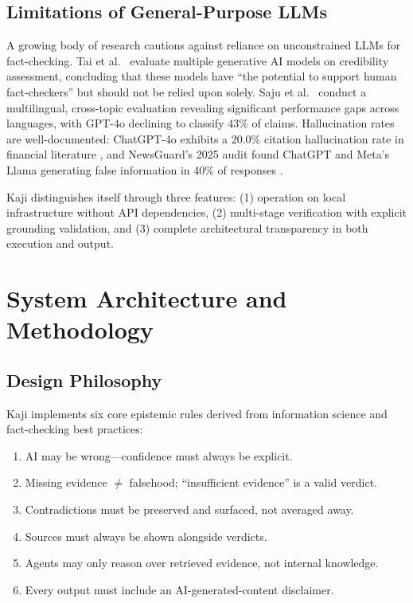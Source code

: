\documentclass[conference]{IEEEtran}
\begin{document}
\subsection{Limitations of General-Purpose LLMs}

A growing body of research cautions against reliance on unconstrained LLMs for fact-checking. Tai et al.\ \cite{tai2025} evaluate multiple generative AI models on credibility assessment, concluding that these models have ``the potential to support human fact-checkers'' but should not be relied upon solely. Saju et al.\ \cite{saju2025} conduct a multilingual, cross-topic evaluation revealing significant performance gaps across languages, with GPT-4o declining to classify 43\% of claims. Hallucination rates are well-documented: ChatGPT-4o exhibits a 20.0\% citation hallucination rate in financial literature \cite{allahyari2025}, and NewsGuard's 2025 audit found ChatGPT and Meta's Llama generating false information in 40\% of responses \cite{newsguard2025}.

Kaji distinguishes itself through three features: (1) operation on local infrastructure without API dependencies, (2) multi-stage verification with explicit grounding validation, and (3) complete architectural transparency in both execution and output.

\section{System Architecture and Methodology}

\subsection{Design Philosophy}

Kaji implements six core epistemic rules derived from information science and fact-checking best practices:

\begin{enumerate}
    \item AI may be wrong---confidence must always be explicit.
    \item Missing evidence $\neq$ falsehood; ``insufficient evidence'' is a valid verdict.
    \item Contradictions must be preserved and surfaced, not averaged away.
    \item Sources must always be shown alongside verdicts.
    \item Agents may only reason over retrieved evidence, not internal knowledge.
    \item Every output must include an AI-generated-content disclaimer.
\end{enumerate}
\end{document}
